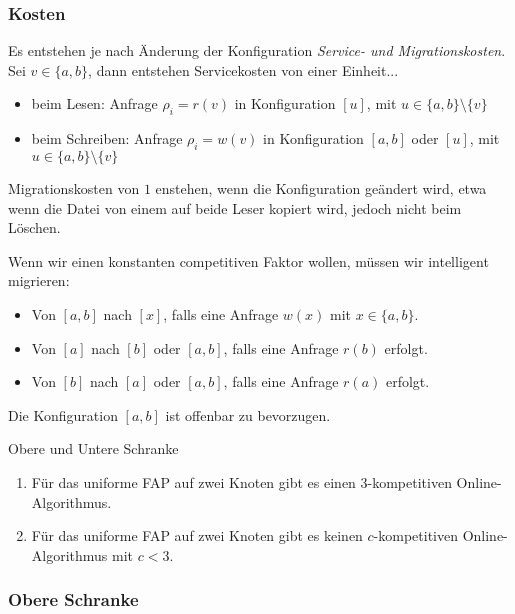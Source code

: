 \documentclass{panikzettel}
\begin{document}
\subsubsection{Kosten}
\label{subsubsec:fap-kosten}
Es entstehen je nach Änderung der Konfiguration \emph{Service- und Migrationskosten}.   \\
Sei $v \in \{a,b\}$, dann entstehen Servicekosten von einer Einheit...
\begin{itemize}
    \item beim Lesen: Anfrage $\rho_i=r(v)$ in Konfiguration $[u]$, mit $u \in \{a,b\} \setminus \{v\}$
    \item beim Schreiben: Anfrage $\rho_i=w(v)$ in Konfiguration $[a,b]$ oder $[u]$, mit $u \in \{a,b\} \setminus \{v\}$
\end{itemize}
Migrationskosten von $1$ enstehen, wenn die Konfiguration geändert wird, etwa wenn die Datei von einem auf beide Leser kopiert wird, jedoch nicht beim Löschen.

Wenn wir einen konstanten competitiven Faktor wollen, müssen wir intelligent migrieren:
\begin{itemize}
    \item Von $[a,b]$ nach $[x]$, falls eine Anfrage $w(x)$ mit $x \in \{a,b\}$.
    \item Von $[a]$ nach $[b]$ oder $[a,b]$, falls eine Anfrage $r(b)$ erfolgt.
    \item Von $[b]$ nach $[a]$ oder $[a,b]$, falls eine Anfrage $r(a)$ erfolgt.
\end{itemize}
Die Konfiguration $[a,b]$ ist offenbar zu bevorzugen.

\begin{theo}{Obere und Untere Schranke}
    \begin{enumerate}[leftmargin=*]
        \item Für das uniforme FAP auf zwei Knoten gibt es einen $3$-kompetitiven Online-Algorithmus.
        \item Für das uniforme FAP auf zwei Knoten gibt es keinen $c$-kompetitiven Online-Algorithmus mit $c < 3$.
    \end{enumerate}
\end{theo}

\subsubsection{Obere Schranke}
\end{document}

